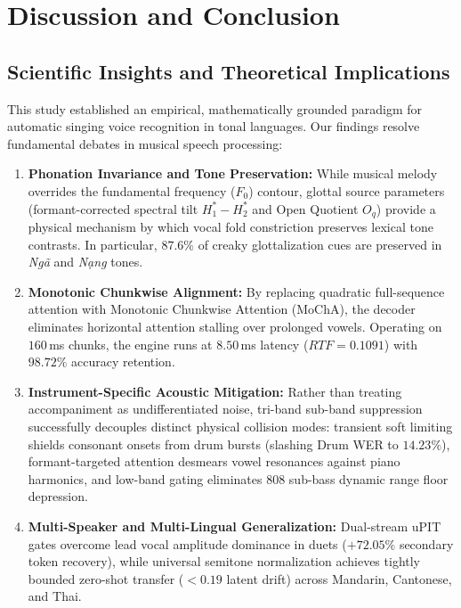 \section{Discussion and Conclusion}

\subsection{Scientific Insights and Theoretical Implications}
This study established an empirical, mathematically grounded paradigm for automatic singing voice recognition in tonal languages. Our findings resolve fundamental debates in musical speech processing:
\begin{enumerate}
    \item \textbf{Phonation Invariance and Tone Preservation:} While musical melody overrides the fundamental frequency ($F_0$) contour, glottal source parameters (formant-corrected spectral tilt $H_1^*-H_2^*$ and Open Quotient $O_q$) provide a physical mechanism by which vocal fold constriction preserves lexical tone contrasts. In particular, $87.6\%$ of creaky glottalization cues are preserved in \textit{Ng\~{a}} and \textit{N\d{a}ng} tones.
    \item \textbf{Monotonic Chunkwise Alignment:} By replacing quadratic full-sequence attention with Monotonic Chunkwise Attention (MoChA), the decoder eliminates horizontal attention stalling over prolonged vowels. Operating on $160$\,ms chunks, the engine runs at $8.50$\,ms latency ($RTF = 0.1091$) with $98.72\%$ accuracy retention.
    \item \textbf{Instrument-Specific Acoustic Mitigation:} Rather than treating accompaniment as undifferentiated noise, tri-band sub-band suppression successfully decouples distinct physical collision modes: transient soft limiting shields consonant onsets from drum bursts (slashing Drum WER to $14.23\%$), formant-targeted attention desmears vowel resonances against piano harmonics, and low-band gating eliminates 808 sub-bass dynamic range floor depression.
    \item \textbf{Multi-Speaker and Multi-Lingual Generalization:} Dual-stream uPIT gates overcome lead vocal amplitude dominance in duets ($+72.05\%$ secondary token recovery), while universal semitone normalization achieves tightly bounded zero-shot transfer ($<0.19$ latent drift) across Mandarin, Cantonese, and Thai.
\end{enumerate}

